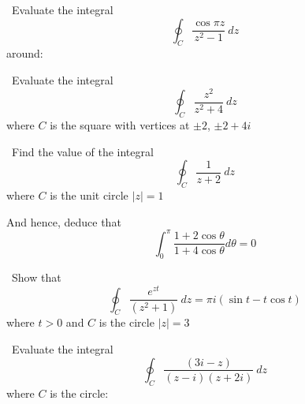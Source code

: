 \documentclass[12pt]{exam}
\newcommand{\modz}[0]{\left|z\right|}
\newcommand{\ccint}[1]{\oint_C #1 \ dz}
\newcommand{\C}[0]{\(C  \) }
\begin{document}
\begin{questions}

\vspace{1em}

\question\ Evaluate the integral \[\ccint{\frac{\cos \pi z}{z^2 - 1}}\] around:

\vspace{1em}

\question\ Evaluate the integral \[\ccint{\frac{z^2}{z^2 + 4}}\] where \C is the square with vertices at \(\pm 2\), \(\pm2 +4i\)

\vspace{1em}

\question\ Find the value of the integral \[\ccint{\frac{1}{z+2}}\] where \C is the unit circle \(\modz = 1\)

And hence, deduce that \[\int_0^\pi \frac{1 + 2\cos \theta}{1 + 4 \cos \theta} d\theta = 0\]


\question\ Show that \[\ccint{\frac{e^{zt}}{\left(z^2 + 1\right)}} = \pi i \left(\sin t - t\cos t\right)\]
where \(t > 0\) and \C is the circle \(\modz = 3\)


\question\ Evaluate the integral \[\ccint{\frac{\left(3i - z\right)}{\left(z -i\right) \left(z + 2i\right)}}\] where \C is the circle:


\end{questions}
\end{document}
